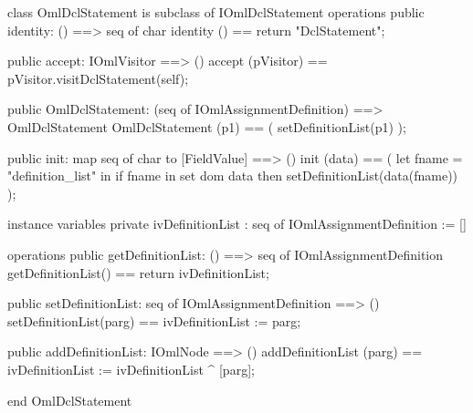 \begin{vdm_al}
class OmlDclStatement is subclass of IOmlDclStatement
operations
  public identity: () ==> seq of char
  identity () == return "DclStatement";

  public accept: IOmlVisitor ==> ()
  accept (pVisitor) == pVisitor.visitDclStatement(self);

  public OmlDclStatement:
      (seq of IOmlAssignmentDefinition) ==> OmlDclStatement
  OmlDclStatement (p1) == 
   ( setDefinitionList(p1) );

  public init: map seq of char to [FieldValue] ==> ()
  init (data) ==
    ( let fname = "definition_list" in
        if fname in set dom data
        then setDefinitionList(data(fname)) );

instance variables
  private ivDefinitionList : seq of IOmlAssignmentDefinition := []

operations
  public getDefinitionList: () ==> seq of IOmlAssignmentDefinition
  getDefinitionList() == return ivDefinitionList;

  public setDefinitionList: seq of IOmlAssignmentDefinition ==> ()
  setDefinitionList(parg) == ivDefinitionList := parg;

  public addDefinitionList: IOmlNode ==> ()
  addDefinitionList (parg) == ivDefinitionList := ivDefinitionList ^ [parg];

end OmlDclStatement
\end{vdm_al}

